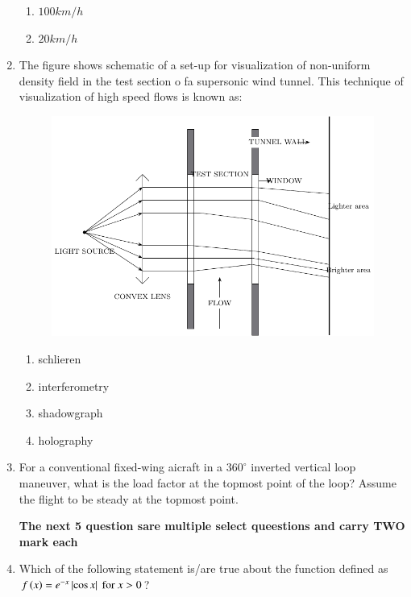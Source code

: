 \documentclass[journal]{IEEEtran}
\begin{document}
\begin{enumerate}
\begin{enumerate}
           \item $100km/h$
           \item $20km/h$
       \end{enumerate}
       \item The figure shows schematic of a set-up for visualization of non-uniform density field in the test section o fa supersonic wind tunnel. This technique of visualization of high speed flows is known as: 
\begin{figure}[ht!]
	    \centering
	    \includegraphics[width=0.5\linewidth]{fig/fig2.pdf}
	\end{figure}    
		\begin{enumerate}
           \item schlieren 
           \item interferometry
           \item shadowgraph
           \item holography
       \end{enumerate}
	\item For a conventional fixed-wing aicraft in a $360^\circ$ inverted vertical loop maneuver, what is the load factor  at the topmost point of the loop? Assume the flight to be steady at the topmost point.
               \begin{enumerate}
	       \end{enumerate}	
\textbf{The next 5 question sare multiple select queestions and carry TWO mark each}
       \item Which of the following statement is/are true about the function defined as $f\left(x\right) = e^{-x}\left\vert\cos x\right\vert \text{ for } x>0 $?
             \begin{enumerate}

\end{enumerate}
\end{enumerate}
\end{document}
